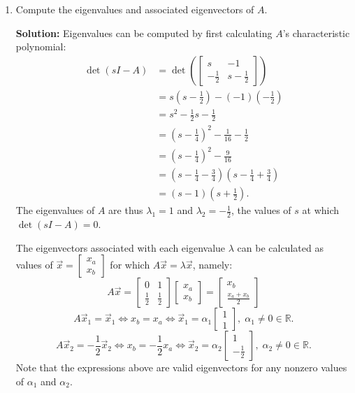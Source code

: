 \documentclass[10pt]{article}
\theoremstyle{definition}
\theoremstyle{plain}
\newcommand{\RR}{\mathbb{R}}
\begin{document}
\begin{enumerate}[label=(\alph*)]
\item Compute the eigenvalues and associated eigenvectors of $A$.

\textbf{Solution:} Eigenvalues can be computed by first calculating $A$'s characteristic polynomial:
\begin{align}
\det(sI - A) &= \det\left( \begin{bmatrix} s & -1 \\ -\frac{1}{2} & s - \frac{1}{2} \end{bmatrix} \right) \\
&= s\left(s - \frac{1}{2}\right) - (-1)\left(-\frac{1}{2}\right) \\
&= s^2 - \frac{1}{2}s - \frac{1}{2} \\
&= \left(s - \frac{1}{4}\right)^2 - \frac{1}{16} - \frac{1}{2} \\
&= \left(s - \frac{1}{4}\right)^2 - \frac{9}{16} \\
&= \left(s - \frac{1}{4} - \frac{3}{4}\right)\left(s - \frac{1}{4} + \frac{3}{4}\right) \\
&= (s - 1)\left(s + \frac{1}{2}\right).
\end{align}
The eigenvalues of $A$ are thus $\lambda_1 = 1$ and $\lambda_2 = -\frac{1}{2}$, the values of $s$ at which $\det(sI - A) = 0$.

The eigenvectors associated with each eigenvalue $\lambda$ can be calculated as values of $\vec{x} = \begin{bmatrix} x_a \\ x_b \end{bmatrix}$ for which $A\vec{x} = \lambda\vec{x}$, namely:
\begin{equation}
A\vec{x} = \begin{bmatrix} 0 & 1 \\ \frac{1}{2} & \frac{1}{2} \end{bmatrix} \begin{bmatrix} x_a \\ x_b \end{bmatrix} = \begin{bmatrix} x_b \\ \frac{x_a + x_b}{2} \end{bmatrix}
\end{equation}
\begin{equation}
A\vec{x}_1 = \vec{x}_1 \iff x_b = x_a \iff \vec{x}_1 = \alpha_1 \begin{bmatrix} 1 \\ 1 \end{bmatrix},\; \alpha_1 \neq 0 \in \RR.
\end{equation}
\begin{equation}
A\vec{x}_2 = -\frac{1}{2}\vec{x}_2 \iff x_b = -\frac{1}{2}x_a \iff \vec{x}_2 = \alpha_2 \begin{bmatrix} 1 \\ -\frac{1}{2} \end{bmatrix},\; \alpha_2 \neq 0 \in \RR.
\end{equation}
Note that the expressions above are valid eigenvectors for any nonzero values of $\alpha_1$ and $\alpha_2$.


\end{enumerate}
\end{document}
